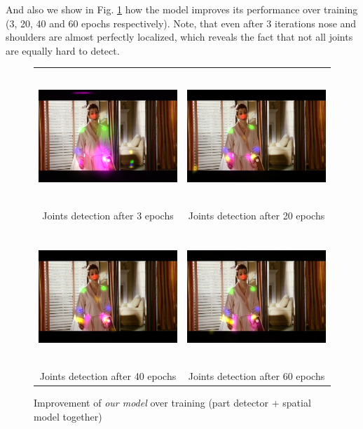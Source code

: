 \documentclass[a4paper,10pt]{article}
\begin{document}
	\newpage	
	And also we show in Fig. \ref{appendix_evolution} how the model improves its performance over training (3, 20, 40 and 60 epochs respectively). Note, that even after 3 iterations nose and shoulders are almost perfectly localized, which reveals the fact that not all joints are equally hard to detect.
	\begin{figure}[H]
		\begin{tabular}{cc}
			\includegraphics[height=5cm]{img/ap_epoch3.png} & 
			\includegraphics[height=5cm]{img/ap_epoch20.png} \\
			Joints detection after 3 epochs & Joints detection after 20 epochs \\
			& \\
			\includegraphics[height=5cm]{img/ap_epoch40.png} &
			\includegraphics[height=5cm]{img/ap_epoch60.png} \\
			Joints detection after 40 epochs & Joints detection after 60 epochs
			\caption{Improvement of \textit{our model} over training (part detector + spatial model together)}
			\label{appendix_evolution}
		\end{tabular}
	\end{figure}
\end{document}
